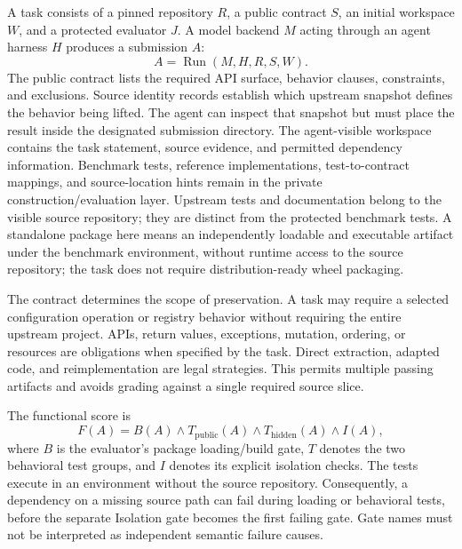 \documentclass[acmsmall,screen,review,anonymous,nonacm]{acmart}
\begin{document}
A task consists of a pinned repository $R$, a public contract $S$, an initial
workspace $W$, and a protected evaluator $J$. A model backend $M$ acting through
an agent harness $H$ produces a submission $A$:
\begin{equation}
 A = \operatorname{Run}(M,H,R,S,W).
\end{equation}
The public contract lists the required API surface, behavior clauses, constraints,
and exclusions. Source identity records establish which upstream snapshot defines
the behavior being lifted. The agent can inspect that snapshot but must place the
result inside the designated submission directory.
The agent-visible workspace contains the task statement, source evidence, and
permitted dependency information. Benchmark tests, reference implementations,
test-to-contract mappings, and source-location hints remain in the private
construction/evaluation layer. Upstream tests and documentation belong to the
visible source repository; they are distinct from the protected benchmark tests.
A standalone package here means an independently loadable and executable
artifact under the benchmark environment, without runtime access to the source
repository; the task does not require distribution-ready wheel packaging.

The contract determines the scope of preservation. A task may require a selected
configuration operation or registry behavior without requiring the entire
upstream project. APIs, return values, exceptions, mutation, ordering, or resources
are obligations when specified by the task. Direct extraction, adapted code, and
reimplementation are legal strategies. This permits multiple passing artifacts
and avoids grading against a single required source slice.

The functional score is
\begin{equation}
 F(A)=B(A)\land T_{\mathrm{public}}(A)\land T_{\mathrm{hidden}}(A)\land I(A),
 \label{eq:functional}
\end{equation}
where $B$ is the evaluator's package loading/build gate, $T$ denotes the two
behavioral test groups, and $I$ denotes its explicit isolation checks. The tests
execute in an environment without the source repository. Consequently, a
dependency on a missing source path can fail during loading or behavioral tests,
before the separate Isolation gate becomes the first failing gate. Gate names
must not be interpreted as independent semantic failure causes.
\end{document}
